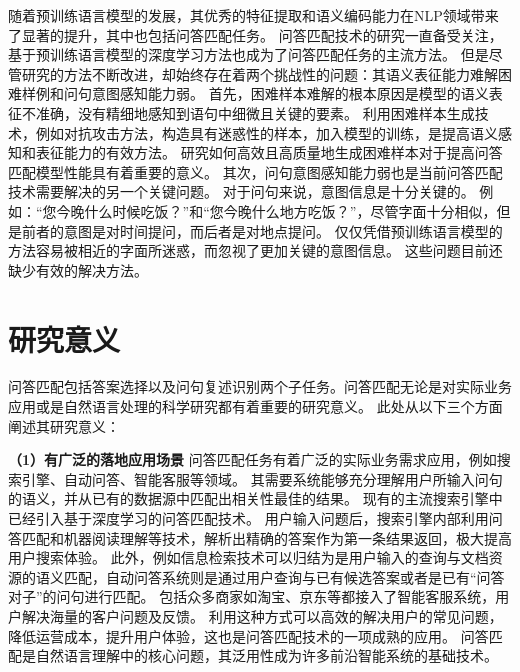 随着预训练语言模型的发展，其优秀的特征提取和语义编码能力在NLP领域带来了显著的提升，其中也包括问答匹配任务。
问答匹配技术的研究一直备受关注，基于预训练语言模型的深度学习方法也成为了问答匹配任务的主流方法。
但是尽管研究的方法不断改进，却始终存在着两个挑战性的问题：其语义表征能力难解困难样例和问句意图感知能力弱。
首先，困难样本难解的根本原因是模型的语义表征不准确，没有精细地感知到语句中细微且关键的要素。
利用困难样本生成技术，例如对抗攻击方法，构造具有迷惑性的样本，加入模型的训练，是提高语义感知和表征能力的有效方法。
研究如何高效且高质量地生成困难样本对于提高问答匹配模型性能具有着重要的意义。
其次，问句意图感知能力弱也是当前问答匹配技术需要解决的另一个关键问题。
对于问句来说，意图信息是十分关键的。
例如：“您今晚什么时候吃饭？”和“您今晚什么地方吃饭？”，尽管字面十分相似，但是前者的意图是对时间提问，而后者是对地点提问。
仅仅凭借预训练语言模型的方法容易被相近的字面所迷惑，而忽视了更加关键的意图信息。
这些问题目前还缺少有效的解决方法。



\section{研究意义}
问答匹配包括答案选择以及问句复述识别两个子任务。问答匹配无论是对实际业务应用或是自然语言处理的科学研究都有着重要的研究意义。
此处从以下三个方面阐述其研究意义：

\textbf{\songti（1）有广泛的落地应用场景}
问答匹配任务有着广泛的实际业务需求应用，例如搜索引擎、自动问答、智能客服等领域。
其需要系统能够充分理解用户所输入问句的语义，并从已有的数据源中匹配出相关性最佳的结果。
现有的主流搜索引擎中已经引入基于深度学习的问答匹配技术。
用户输入问题后，搜索引擎内部利用问答匹配和机器阅读理解等技术，解析出精确的答案作为第一条结果返回，极大提高用户搜索体验。
此外，例如信息检索技术可以归结为是用户输入的查询与文档资源的语义匹配，自动问答系统则是通过用户查询与已有候选答案或者是已有“问答对子”的问句进行匹配。
包括众多商家如淘宝、京东等都接入了智能客服系统，用户解决海量的客户问题及反馈。
利用这种方式可以高效的解决用户的常见问题，降低运营成本，提升用户体验，这也是问答匹配技术的一项成熟的应用。
问答匹配是自然语言理解中的核心问题，其泛用性成为许多前沿智能系统的基础技术。


